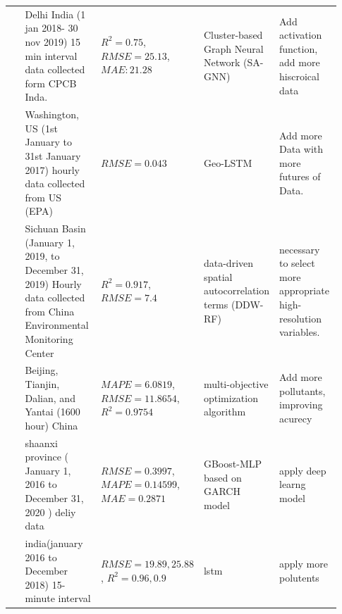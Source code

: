 \documentclass[a4paper, fleqn]{cas-sc}
\theoremstyle{definition}
\theoremstyle{remark}
\begin{document}
\begin{landscape}
{\begin{longtable}[h!]{ p{0.12\linewidth} p{0.27\linewidth} p{0.16\linewidth} p{0.16\linewidth} p{0.22\linewidth} }
 \cite{MANDAL2023137036} & Delhi India (1 jan 2018- 30 nov 2019) 15 min interval data collected form CPCB Inda. &$R^2=0.75$,  $RMSE=25.13$,  $MAE: 21.28$ & Cluster-based Graph Neural Network (SA-GNN) & Add activation function, add more hiscroical data \\
 \cite{MA2019117729} & Washington, US (1st January to 31st January 2017) hourly data collected from US (EPA) & $RMSE = 0.043$ & Geo-LSTM & Add more Data with more futures of Data.  \\
 \cite{ZHANG2022134890}& Sichuan Basin (January 1,  2019,  to December 31,  2019) Hourly data collected from  China Environmental Monitoring Center  & $R^2= 0.917$, $RMSE=7.4$ & data-driven spatial autocorrelation terms (DDW-RF) & necessary to select more appropriate high-resolution variables. \\
\cite{TIAN2022134048} & Beijing,  Tianjin,  Dalian,  and Yantai (1600 hour) China & $MAPE=6.0819$, $RMSE=11.8654$, $R^2=0.9754$ &  multi-objective optimization algorithm & Add more pollutants, improving acurecy \\
\cite{DAI2022131898} &shaanxi province ( January 1,  2016 to December 31,  2020 ) deliy data & $RMSE=0.3997$, $MAPE=0.14599$, $MAE=0.2871$ &GBoost-MLP based on GARCH model & apply deep learng model \\ 
\cite{AGGARWAL2021129660} & india(january 2016 to December 2018) 15-minute interval  & $RMSE=19.89, 25.88$ ,  $R^2=0.96, 0.9$ &lstm&apply more polutents \\


\end{longtable}}
\end{landscape}
\end{document}
